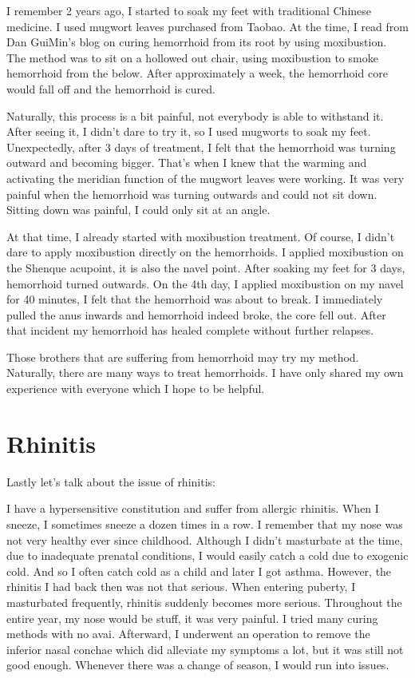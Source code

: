 \documentclass[
]{book}
\begin{document}
I remember 2 years ago, I started to soak my feet with traditional Chinese medicine. I used mugwort leaves purchased from Taobao. At the time, I read from Dan GuiMin's blog on curing hemorrhoid from its root by using moxibustion. The method was to sit on a hollowed out chair, using moxibustion to smoke hemorrhoid from the below. After approximately a week, the hemorrhoid core would fall off and the hemorrhoid is cured.

Naturally, this process is a bit painful, not everybody is able to withstand it. After seeing it, I didn't dare to try it, so I used mugworts to soak my feet. Unexpectedly, after 3 days of treatment, I felt that the hemorrhoid was turning outward and becoming bigger. That's when I knew that the warming and activating the meridian function of the mugwort leaves were working. It was very painful when the hemorrhoid was turning outwards and could not sit down. Sitting down was painful, I could only sit at an angle.

At that time, I already started with moxibustion treatment. Of course, I didn't dare to apply moxibustion directly on the hemorrhoids. I applied moxibustion on the Shenque acupoint, it is also the navel point. After soaking my feet for 3 days, hemorrhoid turned outwards. On the 4th day, I applied moxibustion on my navel for 40 minutes, I felt that the hemorrhoid was about to break. I immediately pulled the anus inwards and hemorrhoid indeed broke, the core fell out. After that incident my hemorrhoid has healed complete without further relapses.

Those brothers that are suffering from hemorrhoid may try my method. Naturally, there are many ways to treat hemorrhoids. I have only shared my own experience with everyone which I hope to be helpful.

\hypertarget{rhinitis}{%
\section{Rhinitis}\label{rhinitis}}

Lastly let's talk about the issue of rhinitis:

I have a hypersensitive constitution and suffer from allergic rhinitis. When I sneeze, I sometimes sneeze a dozen times in a row. I remember that my nose was not very healthy ever since childhood. Although I didn't masturbate at the time, due to inadequate prenatal conditions, I would easily catch a cold due to exogenic cold. And so I often catch cold as a child and later I got asthma. However, the rhinitis I had back then was not that serious. When entering puberty, I masturbated frequently, rhinitis suddenly becomes more serious. Throughout the entire year, my nose would be stuff, it was very painful. I tried many curing methods with no avai. Afterward, I underwent an operation to remove the inferior nasal conchae which did alleviate my symptoms a lot, but it was still not good enough. Whenever there was a change of season, I would run into issues.
\end{document}
